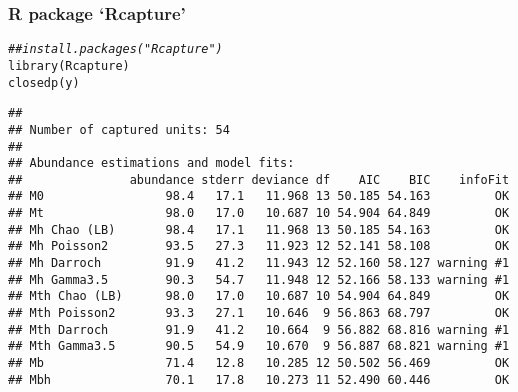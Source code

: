 \documentclass[color=usenames,dvipsnames]{beamer}\usepackage[]{graphicx}\usepackage[]{color}
\makeatletter
\newcommand{\hlcom}[1]{\textcolor[rgb]{0.514,0.506,0.514}{\textit{#1}}}%
\newcommand{\hlstd}[1]{\textcolor[rgb]{0,0,0}{#1}}%
\newcommand{\hlkwd}[1]{\textcolor[rgb]{0.004,0.004,0.506}{#1}}%
\newenvironment{kframe}{%
 \def\at@end@of@kframe{}%
 \ifinner\ifhmode%
  \def\at@end@of@kframe{\end{minipage}}%
  \begin{minipage}{\columnwidth}%
 \fi\fi%
 \def\FrameCommand##1{\hskip\@totalleftmargin \hskip-\fboxsep
 \colorbox{shadecolor}{##1}\hskip-\fboxsep
     \hskip-\linewidth \hskip-\@totalleftmargin \hskip\columnwidth}%
 \MakeFramed {\advance\hsize-\width
   \@totalleftmargin\z@ \linewidth\hsize
   \@setminipage}}%
 {\par\unskip\endMakeFramed%
 \at@end@of@kframe}
\newenvironment{knitrout}{}{} %
\makeatother
\begin{document}









\begin{frame}[fragile]
  \frametitle{R package `Rcapture'}
\begin{knitrout}\scriptsize
{}\color{fgcolor}\begin{kframe}
\begin{alltt}
\hlcom{## install.packages("Rcapture")}
\hlkwd{library}\hlstd{(Rcapture)}
\hlkwd{closedp}\hlstd{(y)}
\end{alltt}
\begin{verbatim}
## 
## Number of captured units: 54 
## 
## Abundance estimations and model fits:
##               abundance stderr deviance df    AIC    BIC    infoFit
## M0                 98.4   17.1   11.968 13 50.185 54.163         OK
## Mt                 98.0   17.0   10.687 10 54.904 64.849         OK
## Mh Chao (LB)       98.4   17.1   11.968 13 50.185 54.163         OK
## Mh Poisson2        93.5   27.3   11.923 12 52.141 58.108         OK
## Mh Darroch         91.9   41.2   11.943 12 52.160 58.127 warning #1
## Mh Gamma3.5        90.3   54.7   11.948 12 52.166 58.133 warning #1
## Mth Chao (LB)      98.0   17.0   10.687 10 54.904 64.849         OK
## Mth Poisson2       93.3   27.1   10.646  9 56.863 68.797         OK
## Mth Darroch        91.9   41.2   10.664  9 56.882 68.816 warning #1
## Mth Gamma3.5       90.5   54.9   10.670  9 56.887 68.821 warning #1
## Mb                 71.4   12.8   10.285 12 50.502 56.469         OK
## Mbh                70.1   17.8   10.273 11 52.490 60.446         OK
\end{verbatim}
\end{kframe}
\end{knitrout}
\end{frame}
\end{document}
